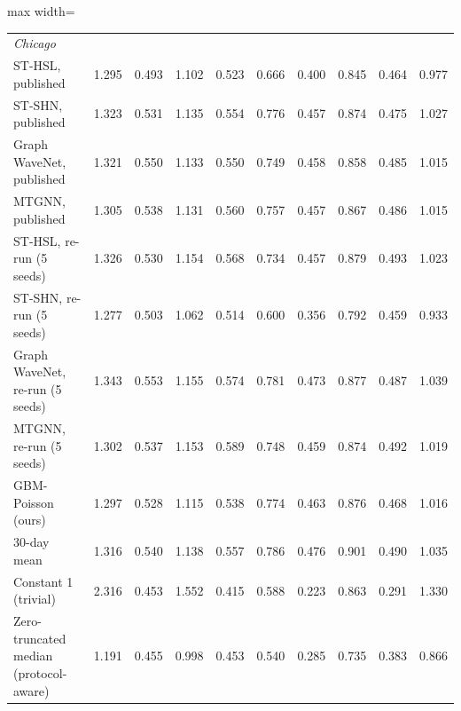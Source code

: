 \begin{table}[!htbp]
\begin{adjustbox}{max width=\linewidth}
\begin{tabular}{l*{8}{r}r}
\midrule
\multicolumn{10}{l}{\textit{Chicago}}\\
ST-HSL, published & 1.295 & 0.493 & 1.102 & 0.523 & 0.666 & 0.400 & 0.845 & 0.464 & 0.977 \\
ST-SHN, published & 1.323 & 0.531 & 1.135 & 0.554 & 0.776 & 0.457 & 0.874 & 0.475 & 1.027 \\
Graph WaveNet, published & 1.321 & 0.550 & 1.133 & 0.550 & 0.749 & 0.458 & 0.858 & 0.485 & 1.015 \\
MTGNN, published & 1.305 & 0.538 & 1.131 & 0.560 & 0.757 & 0.457 & 0.867 & 0.486 & 1.015 \\
ST-HSL, re-run (5 seeds) & 1.326 & 0.530 & 1.154 & 0.568 & 0.734 & 0.457 & 0.879 & 0.493 & 1.023 \\
ST-SHN, re-run (5 seeds) & 1.277 & 0.503 & 1.062 & 0.514 & 0.600 & 0.356 & 0.792 & 0.459 & 0.933 \\
Graph WaveNet, re-run (5 seeds) & 1.343 & 0.553 & 1.155 & 0.574 & 0.781 & 0.473 & 0.877 & 0.487 & 1.039 \\
MTGNN, re-run (5 seeds) & 1.302 & 0.537 & 1.153 & 0.589 & 0.748 & 0.459 & 0.874 & 0.492 & 1.019 \\
GBM-Poisson (ours) & 1.297 & 0.528 & 1.115 & 0.538 & 0.774 & 0.463 & 0.876 & 0.468 & 1.016 \\
30-day mean & 1.316 & 0.540 & 1.138 & 0.557 & 0.786 & 0.476 & 0.901 & 0.490 & 1.035 \\
Constant 1 (trivial) & 2.316 & 0.453 & 1.552 & 0.415 & 0.588 & 0.223 & 0.863 & 0.291 & 1.330 \\
Zero-truncated median (protocol-aware) & 1.191 & 0.455 & 0.998 & 0.453 & 0.540 & 0.285 & 0.735 & 0.383 & 0.866 \\
\bottomrule\end{tabular}\end{adjustbox}\end{table}
